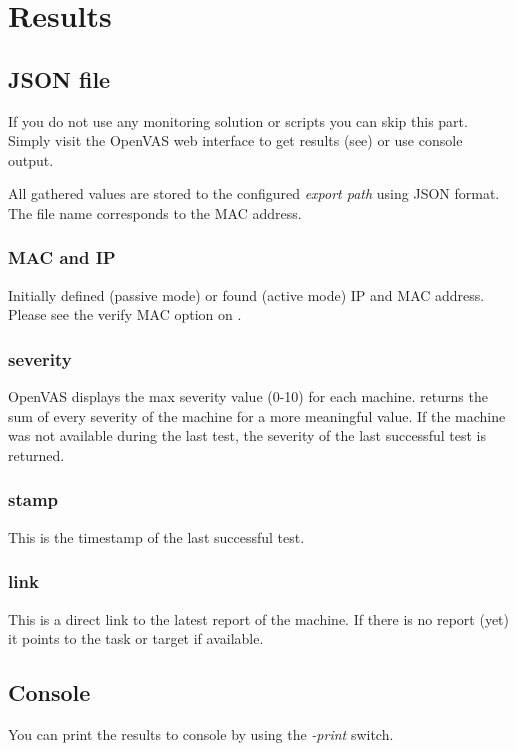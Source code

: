 \breakpoint\section{Results}

\breakpoint\subsection{JSON file}

\hint If you do not use any monitoring solution or scripts you can skip this part. Simply visit the OpenVAS web interface to get results (see) or use console output.

All gathered values are stored to the configured \emph{export path} using JSON format. The file name corresponds to the MAC address.


\breakpoint\subsubsection*{MAC and IP}
Initially defined (passive mode) or found (active mode) IP and MAC address.
Please see the verify MAC option on .

\breakpoint\subsubsection*{severity}
OpenVAS displays the max severity value (0-10) for each machine. \sw returns the sum of every severity of the machine for a more meaningful value.
If the machine was not available during the last test, the severity of the last successful test is returned.

\breakpoint\subsubsection*{stamp}
This is the timestamp of the last successful test.

\breakpoint\subsubsection*{link}\label{sec:link}
This is a direct link to the latest report of the machine. If there is no report (yet) it points to the task or target if available.

\breakpoint\subsection{Console}\label{sec:print_console}
You can print the results to console by using the \emph{-print} switch.

